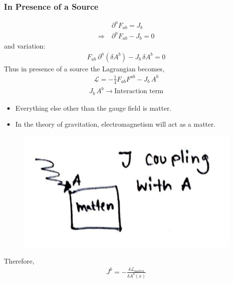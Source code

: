 \documentclass[14pt]{article} %
\begin{document}
\subsubsection{In Presence of a Source}
\begin{align*}
&\partial^a F_{ab} = J_b \\
\Rightarrow ~&\partial^a F_{ab} - J_b = 0
\end{align*}
and variation:
\begin{align*}
F_{ab}~\partial^a (\delta A^b) - J_b \, \delta A^b = 0
\end{align*}
Thus in presence of a source the Lagrangian becomes,
\begin{align*}
\mathcal{L} = -\frac{1}{4} F_{ab} F^{ab} - J_b \,A^b
\end{align*}
\begin{align*}
J_b \, A^b \to \text{Interaction term}
\end{align*}
\begin{tcolorbox}[ proofbox, title=Notes ]
\begin{itemize}
    \item Everything else other than the gauge field is matter.
    \item In the theory of gravitation, electromagnetism will act as a matter.
\end{itemize}
\end{tcolorbox}

\begin{figure}[H]
    \centering
    \includegraphics[width=0.3\linewidth]{figures/C09_1.jpeg}
    \caption*{}
\end{figure}
\vspace{-1.5cm}
Therefore,
\begin{align*}
J^b = -\frac{\delta \mathcal{L}_{\text{matter}}}{\delta A^b(x)}
\end{align*}
\end{document}
